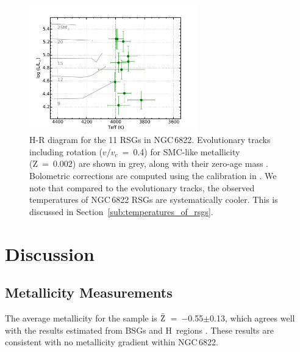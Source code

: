 \begin{figure}
 \centering
\includegraphics[width=0.65\textwidth]{ngc6822/N6822_HRD_thesis}
\caption[H-R diagram for NGC\,6822]{
H-R diagram for the 11 RSGs in NGC\,6822.
Evolutionary tracks including rotation
($v/v_{c}$~=~0.4) for SMC-like metallicity (Z~=~0.002)
are shown in grey, along with their zero-age mass
\protect\citep{2013A&A...558A.103G}.
Bolometric corrections are computed using the calibration in
\protect\cite{2013ApJ...767....3D}.
We note that compared to the evolutionary tracks,
the observed temperatures of NGC\,6822 RSGs are systematically cooler.
This is discussed in Section~\ref{sub:temperatures_of_rsgs}.
}
\label{fig:6822HRD}
\end{figure}



\section{Discussion} %
\label{sec:discussion}

\subsection{Metallicity Measurements} %
\label{sub:metallicity_measurements}

The average metallicity for the sample is $\bar{\rm Z}$~=~$-$0.55$\pm$0.13,
which agrees well with the results estimated from BSGs
\citep{1999A&A...352L..40M,2001ApJ...547..765V,2002PhDT.........3P} and H\,\2 regions
\citep{2006ApJ...642..813L}.
These results are consistent with no metallicity gradient within NGC\,6822.


